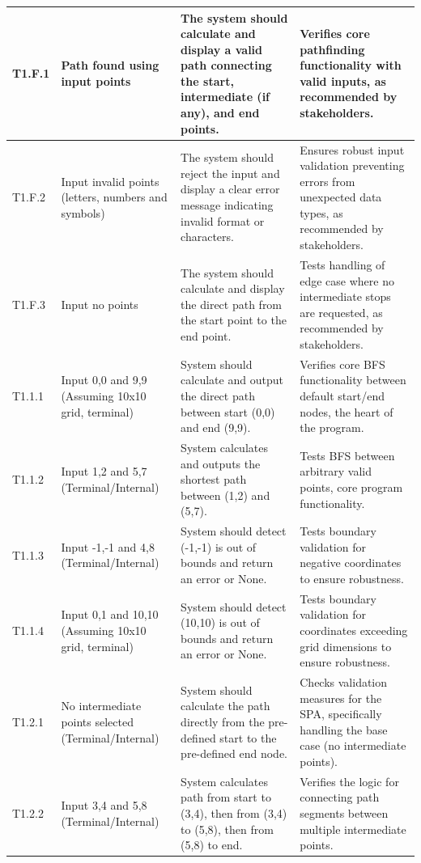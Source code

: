 \begin{longtable}{|p{}|p{}|p{}|p{}|}
	T1.F.1 & Path found using input points & The system should calculate and display a valid path connecting the start, intermediate (if any), and end points. & Verifies core pathfinding functionality with valid inputs, as recommended by stakeholders. \\
	\hline
	T1.F.2 & Input invalid points (letters, numbers and symbols) & The system should reject the input and display a clear error message indicating invalid format or characters. & Ensures robust input validation preventing errors from unexpected data types, as recommended by stakeholders. \\
	\hline
	T1.F.3 & Input no points & The system should calculate and display the direct path from the start point to the end point. & Tests handling of edge case where no intermediate stops are requested, as recommended by stakeholders. \\
	\hline
	T1.1.1 & Input 0,0 and 9,9 (Assuming 10x10 grid, terminal) & System should calculate and output the direct path between start (0,0) and end (9,9). & Verifies core BFS functionality between default start/end nodes, the heart of the program. \\
	\hline
	T1.1.2 & Input 1,2 and 5,7 (Terminal/Internal) & System calculates and outputs the shortest path between (1,2) and (5,7). & Tests BFS between arbitrary valid points, core program functionality. \\
	\hline
	T1.1.3 & Input -1,-1 and 4,8 (Terminal/Internal) & System should detect (-1,-1) is out of bounds and return an error or None. & Tests boundary validation for negative coordinates to ensure robustness. \\
	\hline
	T1.1.4 & Input 0,1 and 10,10 (Assuming 10x10 grid, terminal) & System should detect (10,10) is out of bounds and return an error or None. & Tests boundary validation for coordinates exceeding grid dimensions to ensure robustness. \\
	\hline
	T1.2.1 & No intermediate points selected (Terminal/Internal) & System should calculate the path directly from the pre-defined start to the pre-defined end node. & Checks validation measures for the SPA, specifically handling the base case (no intermediate points). \\
	\hline
	T1.2.2 & Input 3,4 and 5,8 (Terminal/Internal) & System calculates path from start to (3,4), then from (3,4) to (5,8), then from (5,8) to end. & Verifies the logic for connecting path segments between multiple intermediate points. \\

\end{longtable}
